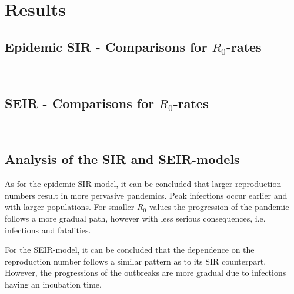 \documentclass[12pt]{article}
\begin{document}
\section{Results}
\subsection{Epidemic SIR - Comparisons for $R_0$-rates}
\begin{figure*}[ht!]
\begin{center}
   \\
   \caption{\label{workflow} (a) $R_0 = 2$, $\gamma = 1/18$ (b) $R_0 = 4$, $\gamma = 1/18$}
\end{center}
\end{figure*}
\subsection{SEIR - Comparisons for $R_0$-rates}
\begin{figure*}[ht!]
\begin{center}
   \\
   \caption{\label{workflow} (a) $R_0 = 2$, $\alpha = 1/5.2$, $\gamma = 1/18$ (b) $R_0 = 4$, $\alpha = 1/5.2$, $\gamma = 1/18$}
\end{center}
\end{figure*}
\subsection{Analysis of the SIR and SEIR-models}
As for the epidemic SIR-model, it can be concluded that larger reproduction numbers result in more pervasive pandemics. Peak infections occur earlier and with larger populations. For smaller $R_0$ values
the progression of the pandemic follows a more gradual path, however with less serious consequences, i.e. infections and fatalities. 

For the SEIR-model, it can be concluded that the dependence on the reproduction number follows a similar pattern as to its SIR counterpart. However, the progressions of the outbreaks are more gradual due to infections having an incubation time.
\end{document}
